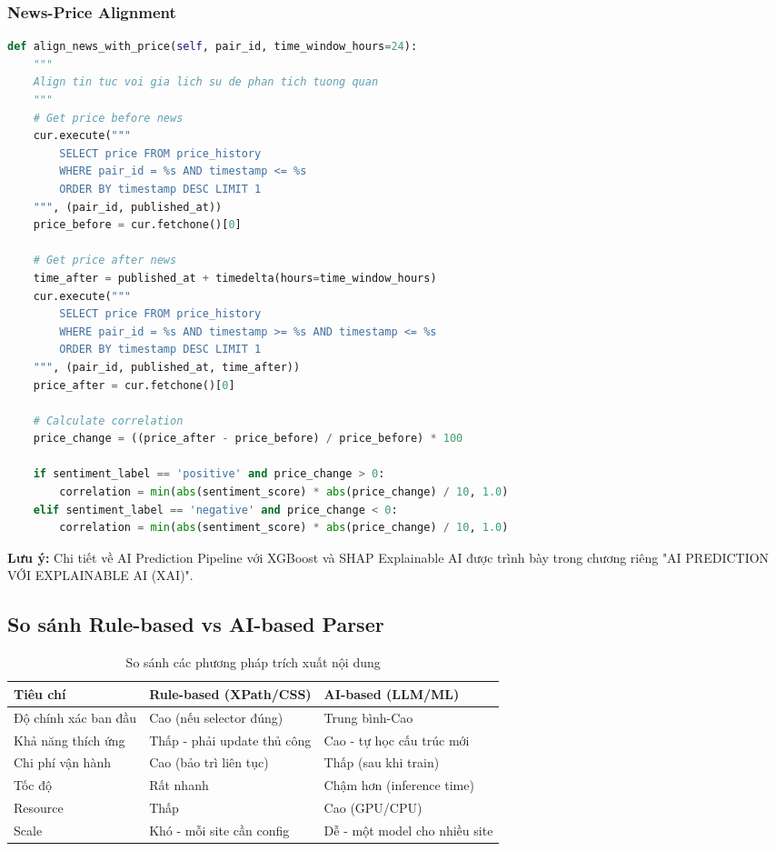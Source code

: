 \subsubsection{News-Price Alignment}

\begin{lstlisting}[language=Python, caption=Correlation Analysis]
def align_news_with_price(self, pair_id, time_window_hours=24):
    """
    Align tin tuc voi gia lich su de phan tich tuong quan
    """
    # Get price before news
    cur.execute("""
        SELECT price FROM price_history
        WHERE pair_id = %s AND timestamp <= %s
        ORDER BY timestamp DESC LIMIT 1
    """, (pair_id, published_at))
    price_before = cur.fetchone()[0]
    
    # Get price after news
    time_after = published_at + timedelta(hours=time_window_hours)
    cur.execute("""
        SELECT price FROM price_history
        WHERE pair_id = %s AND timestamp >= %s AND timestamp <= %s
        ORDER BY timestamp DESC LIMIT 1
    """, (pair_id, published_at, time_after))
    price_after = cur.fetchone()[0]
    
    # Calculate correlation
    price_change = ((price_after - price_before) / price_before) * 100
    
    if sentiment_label == 'positive' and price_change > 0:
        correlation = min(abs(sentiment_score) * abs(price_change) / 10, 1.0)
    elif sentiment_label == 'negative' and price_change < 0:
        correlation = min(abs(sentiment_score) * abs(price_change) / 10, 1.0)
\end{lstlisting}

\textbf{Lưu ý:} Chi tiết về AI Prediction Pipeline với XGBoost và SHAP Explainable AI được trình bày trong chương riêng "AI PREDICTION VỚI EXPLAINABLE AI (XAI)".

\subsection{So sánh Rule-based vs AI-based Parser}

\begin{table}[H]
\centering
\caption{So sánh các phương pháp trích xuất nội dung}
\begin{tabular}{|p{3cm}|p{5cm}|p{5cm}|}
\hline
\textbf{Tiêu chí} & \textbf{Rule-based (XPath/CSS)} & \textbf{AI-based (LLM/ML)} \\
\hline
Độ chính xác ban đầu & Cao (nếu selector đúng) & Trung bình-Cao \\
\hline
Khả năng thích ứng & Thấp - phải update thủ công & Cao - tự học cấu trúc mới \\
\hline
Chi phí vận hành & Cao (bảo trì liên tục) & Thấp (sau khi train) \\
\hline
Tốc độ & Rất nhanh & Chậm hơn (inference time) \\
\hline
Resource & Thấp & Cao (GPU/CPU) \\
\hline
Scale & Khó - mỗi site cần config & Dễ - một model cho nhiều site \\
\hline
\end{tabular}
\end{table}

